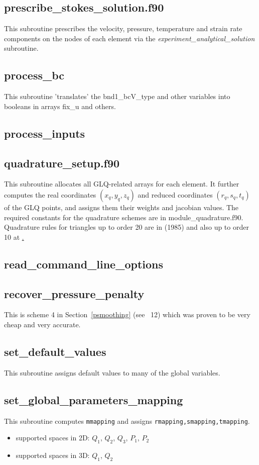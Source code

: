  \subsection{prescribe\_stokes\_solution.f90}
 This subroutine prescribes the velocity, pressure, temperature and strain rate components
 on the nodes of each element via the {\sl experiment\_analytical\_solution} subroutine.
 \subsection{process\_bc}
 This subroutine 'translates' the bnd1\_bcV\_type and other variables into booleans in 
 arrays fix\_u and others.
 \subsection{process\_inputs}

 \subsection{quadrature\_setup.f90}
 This subroutine allocates all GLQ-related arrays for each element.
 It further computes the real coordinates $(x_q,y_q,z_q)$ and reduced 
 coordinates $(r_q,s_q,t_q)$ of the GLQ points, and assigns them their weights and
 jacobian values.
 The required constants for the quadrature schemes are in 
 {\filenamefont module\_quadrature.f90}.
 Quadrature rules for triangles up to order 20 are in \textcite{duna85} (1985) 
 and also up to order 10 at \href{https://mathsfromnothing.au/triangle-quadrature-rules/}.
 \subsection{read\_command\_line\_options}

 \subsection{recover\_pressure\_penalty}
 This is scheme 4 in Section~\ref{psmoothing} (see \stone~12) which was proven to be 
 very cheap and very accurate. 
 \subsection{set\_default\_values}
 This subroutine assigns default values to many of the global variables.
 \subsection{set\_global\_parameters\_mapping}
 This subroutine computes {\tt mmapping} and assigns {\tt rmapping,smapping,tmapping}.
 \begin{itemize}
 \item supported spaces in 2D: $Q_1$, $Q_2$, $Q_3$, $P_1$, $P_2$
 \item supported spaces in 3D: $Q_1$, $Q_2$
 \end{itemize}

